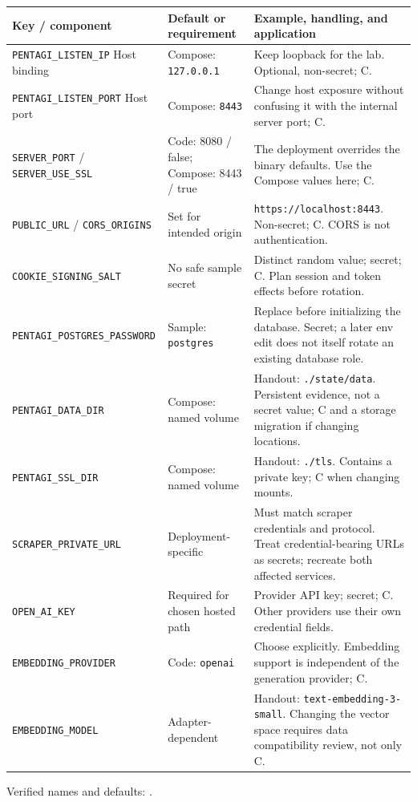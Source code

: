 \documentclass[11pt,letterpaper]{article}
\newcommand{\code}[1]{\nolinkurl{#1}}
\newcommand{\src}[1]{\cite{#1}}
\begin{document}
{\small
\begin{longtable}{@{}L{0.34\textwidth}L{0.19\textwidth}L{0.41\textwidth}@{}}
\toprule
\textbf{Key / component} & \textbf{Default or requirement} &
\textbf{Example, handling, and application}\\
\midrule\endhead
\code{PENTAGI_LISTEN_IP} \newline Host binding &
Compose: \code{127.0.0.1} &
Keep loopback for the lab. Optional, non-secret; C.\\
\code{PENTAGI_LISTEN_PORT} \newline Host port &
Compose: \code{8443} &
Change host exposure without confusing it with the internal server port; C.\\
\code{SERVER_PORT} / \code{SERVER_USE_SSL} &
Code: 8080 / false; Compose: 8443 / true &
The deployment overrides the binary defaults. Use the Compose values here; C.\\
\code{PUBLIC_URL} / \code{CORS_ORIGINS} &
Set for intended origin &
\code{https://localhost:8443}. Non-secret; C. CORS is not authentication.\\
\code{COOKIE_SIGNING_SALT} &
No safe sample secret &
Distinct random value; secret; C. Plan session and token effects before rotation.\\
\code{PENTAGI_POSTGRES_PASSWORD} &
Sample: \code{postgres} &
Replace before initializing the database. Secret; a later env edit does not
itself rotate an existing database role.\\
\code{PENTAGI_DATA_DIR} &
Compose: named volume &
Handout: \code{./state/data}. Persistent evidence, not a secret value; C and
a storage migration if changing locations.\\
\code{PENTAGI_SSL_DIR} &
Compose: named volume &
Handout: \code{./tls}. Contains a private key; C when changing mounts.\\
\code{SCRAPER_PRIVATE_URL} &
Deployment-specific &
Must match scraper credentials and protocol. Treat credential-bearing URLs as
secrets; recreate both affected services.\\
\code{OPEN_AI_KEY} &
Required for chosen hosted path &
Provider API key; secret; C. Other providers use their own credential fields.\\
\code{EMBEDDING_PROVIDER} &
Code: \code{openai} &
Choose explicitly. Embedding support is independent of the generation provider; C.\\
\code{EMBEDDING_MODEL} &
Adapter-dependent &
Handout: \code{text-embedding-3-small}. Changing the vector space requires
data compatibility review, not only C.\\
\bottomrule
\end{longtable}}
{\small Verified names and defaults: \src{env,config,embedding,compose}.}
\end{document}
